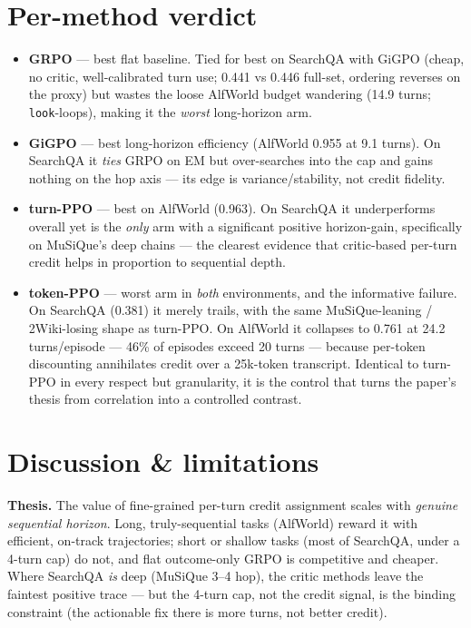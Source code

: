 \documentclass[11pt]{article}
\begin{document}
\section{Per-method verdict}
\begin{itemize}\itemsep2pt
\item\textbf{GRPO} --- best flat baseline. Tied for best on SearchQA with GiGPO (cheap, no critic,
well-calibrated turn use; 0.441 vs 0.446 full-set, ordering reverses on the proxy)
but wastes the loose AlfWorld budget wandering (14.9 turns; \texttt{look}-loops), making it the
\emph{worst} long-horizon arm.
\item\textbf{GiGPO} --- best long-horizon efficiency (AlfWorld 0.955 at 9.1 turns). On SearchQA it
\emph{ties} GRPO on EM but over-searches into the cap and gains nothing on the hop axis --- its edge
is variance/stability, not credit fidelity.
\item\textbf{turn-PPO} --- best on AlfWorld (0.963). On SearchQA it underperforms overall yet is the
\emph{only} arm with a significant positive horizon-gain, specifically on MuSiQue's deep chains ---
the clearest evidence that critic-based per-turn credit helps in proportion to sequential depth.
\item\textbf{token-PPO} --- worst arm in \emph{both} environments, and the informative failure.
On SearchQA (0.381) it merely trails, with the same MuSiQue-leaning / 2Wiki-losing shape as turn-PPO.
On AlfWorld it collapses to 0.761 at 24.2 turns/episode --- 46\% of episodes exceed 20 turns --- because
per-token discounting annihilates credit over a 25k-token transcript. Identical to turn-PPO in every
respect but granularity, it is the control that turns the paper's thesis from correlation into a
controlled contrast.
\end{itemize}

\section{Discussion \& limitations}
\textbf{Thesis.} The value of fine-grained per-turn credit assignment scales with \emph{genuine
sequential horizon}. Long, truly-sequential tasks (AlfWorld) reward it with efficient, on-track
trajectories; short or shallow tasks (most of SearchQA, under a 4-turn cap) do not, and flat
outcome-only GRPO is competitive and cheaper. Where SearchQA \emph{is} deep (MuSiQue 3--4 hop), the
critic methods leave the faintest positive trace --- but the 4-turn cap, not the credit signal, is
the binding constraint (the actionable fix there is more turns, not better credit).
\end{document}
